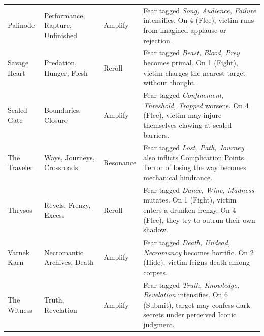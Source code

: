 \begin{longtable}{@{}p{3.2cm}p{4.5cm}p{2.8cm}p{5.9cm}@{}}
Palinode & Performance, Rapture, Unfinished & Amplify & 
Fear tagged \emph{Song, Audience, Failure} intensifies. On 4 (Flee), victim runs from imagined applause or rejection. \\

Savage Heart & Predation, Hunger, Flesh & Reroll & 
Fear tagged \emph{Beast, Blood, Prey} becomes primal. On 1 (Fight), victim charges the nearest target without thought. \\

Sealed Gate & Boundaries, Closure & Amplify & 
Fear tagged \emph{Confinement, Threshold, Trapped} worsens. On 4 (Flee), victim may injure themselves clawing at sealed barriers. \\

The Traveler & Ways, Journeys, Crossroads & Resonance & 
Fear tagged \emph{Lost, Path, Journey} also inflicts Complication Points. Terror of losing the way becomes mechanical hindrance. \\

Thrysos & Revels, Frenzy, Excess & Reroll & 
Fear tagged \emph{Dance, Wine, Madness} mutates. On 1 (Fight), victim enters a drunken frenzy. On 4 (Flee), they try to outrun their own shadow. \\

Varnek Karn & Necromantic Archives, Death & Amplify & 
Fear tagged \emph{Death, Undead, Necromancy} becomes horrific. On 2 (Hide), victim feigns death among corpses. \\

The Witness & Truth, Revelation & Amplify & 
Fear tagged \emph{Truth, Knowledge, Revelation} intensifies. On 6 (Submit), target may confess dark secrets under perceived Iconic judgment. \\

\end{longtable}